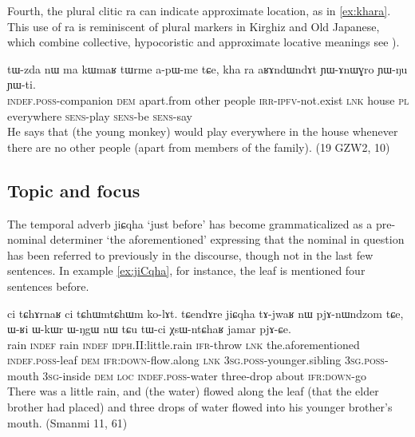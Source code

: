 \documentclass[oldfontcommands,oneside,a4paper,11pt]{article}
\newcommand{\ipa}[1]{{\phon #1}} %
\begin{document}
Fourth, the plural clitic \ipa{ra} can indicate approximate location, as in \ref{ex:khara}. This use of \ipa{ra} is reminiscent of plural markers in Kirghiz and Old Japanese, which combine collective, hypocoristic and approximate locative meanings see \citealt[195]{antonov07ra}).

\begin{exe}
\ex \label{ex:khara}
\gll
\ipa{tɯ-zda} 	\ipa{nɯ} 	\ipa{ma} 	\ipa{kɯmaʁ} 	\ipa{tɯrme} 	\ipa{a-pɯ-me} 	\ipa{tɕe,} 	\ipa{kha} 	\ipa{ra} 	\ipa{aʁɤndɯndɤt} \ipa{ɲɯ-ɤnɯɣro} 	\ipa{ɲɯ-ŋu} 	\ipa{ɲɯ-ti.} \\
\textsc{indef.poss}-companion \textsc{dem} apart.from other people \textsc{irr-ipfv}-not.exist \textsc{lnk} house \textsc{pl} everywhere \textsc{sens}-play \textsc{sens}-be \textsc{sens}-say \\
\glt He says that (the young monkey) would play everywhere in the house whenever there are no other people (apart from members of the family). (19 GZW2, 10)
\end{exe}

 

 \subsection{Topic and focus} 

The temporal adverb \ipa{jiɕqha} `just before' has become grammaticalized as a pre-nominal determiner `the aforementioned' expressing that the nominal in question has been referred to previously in the discourse, though not in the last few sentences. In example \ref{ex:jiCqha}, for instance, the leaf is mentioned four sentences before.

\begin{exe}
\ex \label{ex:jiCqha}
 \gll \ipa{tɯmɯ} 	\ipa{ci} 	\ipa{tɕhɤrnaʁ} 	\ipa{ci} 	\ipa{tɕhɯmtɕhɯm} 	\ipa{ko-lɤt.} 	\ipa{tɕendɤre} 	\ipa{jiɕqha} 	\ipa{tɤ-jwaʁ} 	\ipa{nɯ} 	\ipa{pjɤ-nɯndzom} 	\ipa{tɕe,} 	\ipa{ɯ-ʁi} 	\ipa{ɯ-kɯr} 	\ipa{ɯ-ŋgɯ} 	\ipa{nɯ} 	\ipa{tɕu} 	\ipa{tɯ-ci} 	\ipa{χsɯ-ntɕhaʁ} 	\ipa{jamar} 	\ipa{pjɤ-ɕe.} \\
 rain \textsc{indef}  rain \textsc{indef} \textsc{idph}.II:little.rain \textsc{ifr}-throw \textsc{lnk} the.aforementioned \textsc{indef.poss}-leaf \textsc{dem} \textsc{ifr:down}-flow.along \textsc{lnk} \textsc{3sg.poss}-younger.sibling  \textsc{3sg.poss}-mouth \textsc{3sg}-inside \textsc{dem} \textsc{loc} \textsc{indef.poss}-water three-drop about \textsc{ifr:down}-go \\
 \glt There was a little rain, and (the water) flowed along the leaf (that the elder brother had placed) and three drops of water flowed into his younger brother's mouth. (Smanmi 11, 61)
\end{exe}
\end{document}
